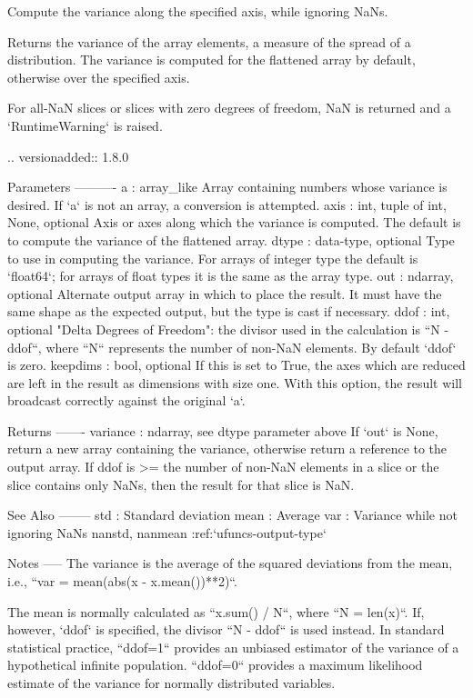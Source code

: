 \begin{DoxyVerb}Compute the variance along the specified axis, while ignoring NaNs.

Returns the variance of the array elements, a measure of the spread of
a distribution.  The variance is computed for the flattened array by
default, otherwise over the specified axis.

For all-NaN slices or slices with zero degrees of freedom, NaN is
returned and a `RuntimeWarning` is raised.

.. versionadded:: 1.8.0

Parameters
----------
a : array_like
    Array containing numbers whose variance is desired.  If `a` is not an
    array, a conversion is attempted.
axis : {int, tuple of int, None}, optional
    Axis or axes along which the variance is computed.  The default is to compute
    the variance of the flattened array.
dtype : data-type, optional
    Type to use in computing the variance.  For arrays of integer type
    the default is `float64`; for arrays of float types it is the same as
    the array type.
out : ndarray, optional
    Alternate output array in which to place the result.  It must have
    the same shape as the expected output, but the type is cast if
    necessary.
ddof : int, optional
    "Delta Degrees of Freedom": the divisor used in the calculation is
    ``N - ddof``, where ``N`` represents the number of non-NaN
    elements. By default `ddof` is zero.
keepdims : bool, optional
    If this is set to True, the axes which are reduced are left
    in the result as dimensions with size one. With this option,
    the result will broadcast correctly against the original `a`.


Returns
-------
variance : ndarray, see dtype parameter above
    If `out` is None, return a new array containing the variance,
    otherwise return a reference to the output array. If ddof is >= the
    number of non-NaN elements in a slice or the slice contains only
    NaNs, then the result for that slice is NaN.

See Also
--------
std : Standard deviation
mean : Average
var : Variance while not ignoring NaNs
nanstd, nanmean
:ref:`ufuncs-output-type`

Notes
-----
The variance is the average of the squared deviations from the mean,
i.e.,  ``var = mean(abs(x - x.mean())**2)``.

The mean is normally calculated as ``x.sum() / N``, where ``N = len(x)``.
If, however, `ddof` is specified, the divisor ``N - ddof`` is used
instead.  In standard statistical practice, ``ddof=1`` provides an
unbiased estimator of the variance of a hypothetical infinite
population.  ``ddof=0`` provides a maximum likelihood estimate of the
variance for normally distributed variables.


\end{DoxyVerb}
